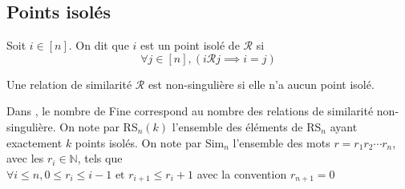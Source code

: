 \subsection{Points isolés}
\begin{definition}
	\begin{rm}
		Soit $i \in [n]$. On dit que $i$ est un point isolé de $\mathcal{R}$ si \\
		$$\forall j \in [n], (i\mathcal{R} j\implies i=j) $$
	\end{rm}
\end{definition}
\begin{definition}
	\begin{rm}
		Une relation de similarité $\mathcal{R}$ est non-singulière si elle n'a aucun point
		isolé.
	\end{rm}
\end{definition}
		Dans \cite{TFine}, le nombre de Fine correspond au nombre des relations de similarité non-singulière.
On note par RS$_{n}(k)$ l'ensemble des éléments de RS$_{n}$ ayant exactement $k$ points isolés.
On note par Sim$_{n}$ l'ensemble des mots $r=r_{1} r_{2}\cdots r_{n}$, avec les $r_{i}\in\mathbb{N}$, tels que \\
$\forall i\leq n, 0\leq r_{i} \leq i-1 \text{ et }  r_{i+1}\leq r_{i}+1$ avec la convention $r_{n+1}=0$

